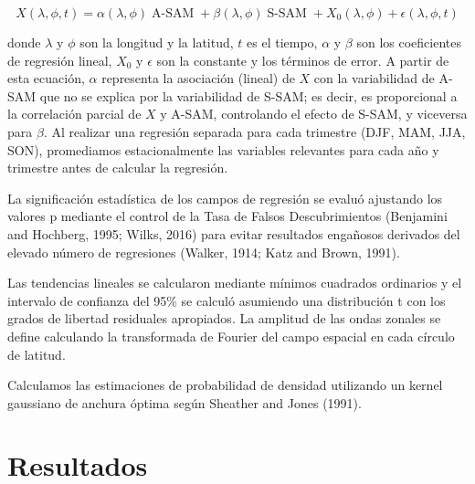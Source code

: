 \documentclass[12pt,oneside]{reedthesis}
\begin{document}
\[
X(\lambda, \phi, t) = \alpha(\lambda, \phi) \operatorname{A-SAM} + \beta(\lambda, \phi) \operatorname{S-SAM} + X_0(\lambda, \phi) + \epsilon(\lambda, \phi, t)
\]

donde \(\lambda\) y \(\phi\) son la longitud y la latitud, \(t\) es el tiempo, \(\alpha\) y \(\beta\) son los coeficientes de regresión lineal, \(X_0\) y \(\epsilon\) son la constante y los términos de error.
A partir de esta ecuación, \(\alpha\) representa la asociación (lineal) de \(X\) con la variabilidad de A\nobreakdash-SAM que no se explica por la variabilidad de S\nobreakdash-SAM; es decir, es proporcional a la correlación parcial de \(X\) y A\nobreakdash-SAM, controlando el efecto de S\nobreakdash-SAM, y viceversa para \(\beta\).
Al realizar una regresión separada para cada trimestre (DJF, MAM, JJA, SON), promediamos estacionalmente las variables relevantes para cada año y trimestre antes de calcular la regresión.

La significación estadística de los campos de regresión se evaluó ajustando los valores p mediante el control de la Tasa de Falsos Descubrimientos (Benjamini and Hochberg, 1995; Wilks, 2016) para evitar resultados engañosos derivados del elevado número de regresiones (Walker, 1914; Katz and Brown, 1991).

Las tendencias lineales se calcularon mediante mínimos cuadrados ordinarios y el intervalo de confianza del 95\% se calculó asumiendo una distribución t con los grados de libertad residuales apropiados.
La amplitud de las ondas zonales se define calculando la transformada de Fourier del campo espacial en cada círculo de latitud.

Calculamos las estimaciones de probabilidad de densidad utilizando un kernel gaussiano de anchura óptima según Sheather and Jones (1991).

\hypertarget{resultados}{%
\section{Resultados}\label{resultados}}
\end{document}

